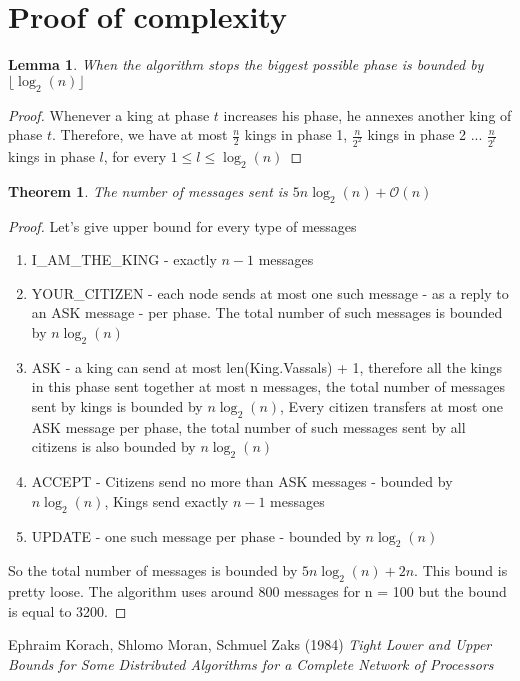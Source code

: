 \documentclass{article}
\newtheorem{lemma}{Lemma}
\newtheorem{theorem}{Theorem}
\begin{document}
\section*{Proof of complexity}
\begin{lemma}
When the algorithm stops the biggest possible phase is bounded by \(\lfloor \log_2(n) \rfloor\)
\end{lemma}

\begin{proof}
Whenever a king at phase \(t\) 
increases his phase, he annexes another 
king of phase \(t\). Therefore, we have at 
most \(\frac{n}{2}\) kings in phase 1, \(\frac{n}{2^2}\) kings in  phase 2 ... \(\frac{n}{2^l}\) kings in phase \(l\), for every \(1 \leq l \leq \log_2(n)\)
\end{proof}
\begin{theorem}
The number of messages sent is \(5n\log_2(n) + \mathcal{O}(n)\)
\end{theorem}
\begin{proof}
Let's give upper bound for every type of messages
\begin{enumerate}
    \item I\_AM\_THE\_KING - exactly \(n-1\) messages
    \item YOUR\_CITIZEN - each node sends at most one such message - as a reply to an ASK message - per phase. The total number of such messages is bounded by \(n\log_2(n)\)
    \item ASK - a king can send at most len(King.Vassals) + 1, therefore all the kings in this phase sent together at most n messages, the total number of messages sent by kings is bounded by \(n\log_2(n)\), Every citizen transfers at most one ASK message per phase, the total number of such messages sent by all citizens is also bounded by \(n\log_2(n)\) 
    \item ACCEPT - Citizens send no more than ASK messages - bounded by \(n\log_2(n)\), Kings send exactly \(n-1\) messages
    \item UPDATE - one such message per phase - bounded by  \(n\log_2(n)\) 
\end{enumerate}
    So the total number of messages is bounded by \(5n\log_2(n) + 2n\). This bound is pretty loose. The algorithm uses around 800 messages for n = 100 but the bound is equal to 3200.
\end{proof}

\begin{thebibliography}{9}
Ephraim Korach, Shlomo Moran, Schmuel Zaks (1984)
\emph{Tight Lower and Upper Bounds for Some Distributed Algorithms for a Complete Network of Processors}
\end{thebibliography}
\end{document}
